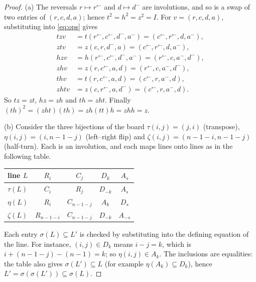 \documentclass[11pt]{amsart}
\theoremstyle{plain}
\theoremstyle{definition}
\theoremstyle{remark}
\numberwithin{equation}{section}
\newcommand{\rev}[1]{#1^{\leftarrow}}  %
\newcommand{\refl}[1]{#1^{-}}          %
\begin{document}
\begin{proof}
(a) The reversals \(r\mapsto\rev{r}\) and \(d\mapsto\refl{d}\) are involutions, and so is
a swap of two entries of \((r,c,d,a)\); hence \(t^2=h^2=z^2=I\). For \(v=(r,c,d,a)\),
substituting into \eqref{eq:ops} gives
\begin{align*}
tzv&=t(\rev{r},\rev{c},\refl{d},\refl{a})=(\rev{c},\rev{r},d,\refl{a}),\\
ztv&=z(c,r,\refl{d},a)=(\rev{c},\rev{r},d,\refl{a}),\\
hzv&=h(\rev{r},\rev{c},\refl{d},\refl{a})=(\rev{r},c,\refl{a},\refl{d}),\\
zhv&=z(r,\rev{c},a,d)=(\rev{r},c,\refl{a},\refl{d}),\\
thv&=t(r,\rev{c},a,d)=(\rev{c},r,\refl{a},d),\\
zhtv&=z(c,\rev{r},a,\refl{d})=(\rev{c},r,\refl{a},d).
\end{align*}
So \(tz=zt\), \(hz=zh\) and \(th=zht\). Finally \((th)^2=(zht)(th)=zh(tt)h=zhh=z\).

(b) Consider the three bijections of the board \(\tau(i,j)=(j,i)\) (transpose),
\(\eta(i,j)=(i,n-1-j)\) (left--right flip) and \(\zeta(i,j)=(n-1-i,n-1-j)\) (half-turn).
Each is an involution, and each maps lines onto lines as in the following table.
\begin{center}
\begin{tabular}{@{}lcccc@{}}
\toprule
line \(L\) & \(R_i\) & \(C_j\) & \(D_k\) & \(A_s\)\\
\midrule
\(\tau(L)\) & \(C_i\) & \(R_j\) & \(D_{-k}\) & \(A_s\)\\
\(\eta(L)\) & \(R_i\) & \(C_{n-1-j}\) & \(A_k\) & \(D_s\)\\
\(\zeta(L)\) & \(R_{n-1-i}\) & \(C_{n-1-j}\) & \(D_{-k}\) & \(A_{-s}\)\\
\bottomrule
\end{tabular}
\end{center}
Each entry \(\sigma(L)\subseteq L'\) is checked by substituting into the defining
equation of the line. For instance, \((i,j)\in D_k\) means \(i-j=k\), which is
\(i+(n-1-j)-(n-1)=k\); so \(\eta(i,j)\in A_k\). The inclusions are equalities: the table
also gives \(\sigma(L')\subseteq L\) (for example \(\eta(A_k)\subseteq D_k\)), hence
\(L'=\sigma(\sigma(L'))\subseteq\sigma(L)\).


\end{proof}
\end{document}
